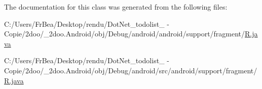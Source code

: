The documentation for this class was generated from the following files:\begin{CompactItemize}
\item 
C:/Users/FrBea/Desktop/rendu/DotNet\_\-todolist\_ - Copie/2doo/\_\-2doo.Android/obj/Debug/android/android/support/fragment/\hyperlink{android_2support_2fragment_2_r_8java}{R.java}\item 
C:/Users/FrBea/Desktop/rendu/DotNet\_\-todolist\_ - Copie/2doo/\_\-2doo.Android/obj/Debug/android/src/android/support/fragment/\hyperlink{src_2android_2support_2fragment_2_r_8java}{R.java}\end{CompactItemize}
